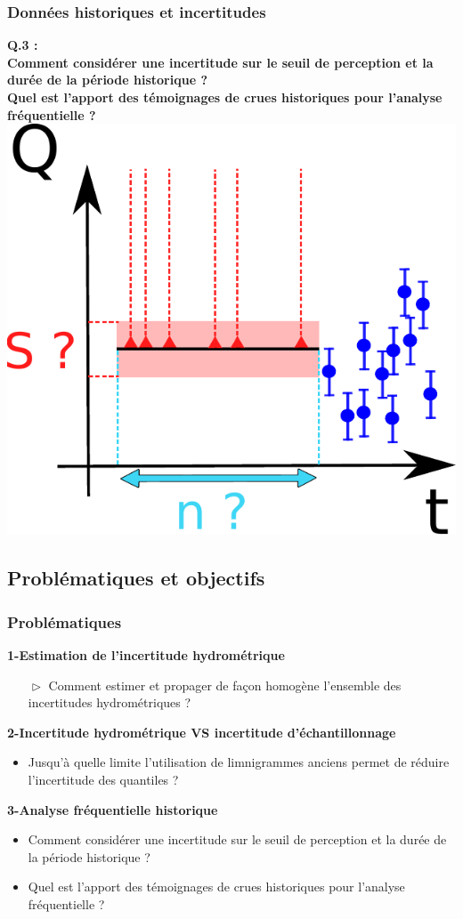 \documentclass[compress,9pt]{beamer}
\begin{document}
	\begin{frame}
		\frametitle{Données historiques et incertitudes}
		\centering
		\large{\textbf{Q.3 :\\
		\vfill
		Comment considérer une incertitude sur le seuil de perception et la durée de la période historique ?\\
		\vfill
		Quel est l'apport des témoignages de crues historiques pour l'analyse fréquentielle ?\\}}
		\vfill
		\includegraphics[width = .35\textwidth]{./Figures/uSuN.pdf}
	\end{frame}
	
	\subsection{Problématiques et objectifs}
	\begin{frame}
	    \frametitle{Problématiques}
		\vfill
		\large{\textbf{1-Estimation de l'incertitude hydrométrique}}
		\vspace{5pt}
		\begin{itemize}
			\item [$\vartriangleright$] Comment estimer et propager de façon homogène l'ensemble des incertitudes hydrométriques ? 
		\end{itemize}
		\vfill
		\large{\textbf{2-Incertitude hydrométrique VS incertitude d'échantillonnage}}
		\vspace{5pt}
		\begin{itemize}
			\item<2->[$\vartriangleright$] Jusqu'à quelle limite l'utilisation de limnigrammes anciens permet de réduire l'incertitude des quantiles ?
		\end{itemize}
		\vfill
		\large{\textbf{3-Analyse fréquentielle historique}}
		\vspace{5pt}
		\begin{itemize}
			\item<3-> [$\vartriangleright$] Comment considérer une incertitude sur le seuil de perception et la durée de la période historique ?\\
			\item<3->[$\vartriangleright$] Quel est l'apport des témoignages de crues historiques pour l'analyse fréquentielle ?
		\end{itemize}
		\vfill
	\end{frame}
	
\end{document}
